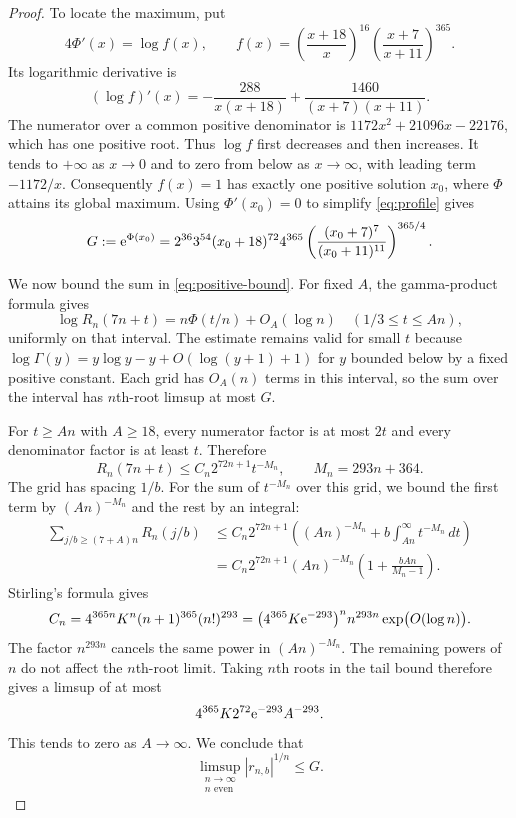 \begin{proof}
To locate the maximum, put
\begin{equation}\label{eq:f}
 4\Phi'(x)=\log f(x),\qquad
 f(x)=\left(\frac{x+18}{x}\right)^{16}
      \left(\frac{x+7}{x+11}\right)^{365}.
\end{equation}
Its logarithmic derivative is
\[
 (\log f)'(x)=-\frac{288}{x(x+18)}
                  +\frac{1460}{(x+7)(x+11)}.
\]
The numerator over a common positive denominator is
$1172x^2+21096x-22176$, which has one positive root. Thus $\log f$
first decreases and then increases. It tends to $+\infty$ as $x\to0$
and to zero from below as $x\to\infty$, with leading term $-1172/x$.
Consequently $f(x)=1$ has exactly one positive solution $x_0$, where
$\Phi$ attains its global maximum. Using $\Phi'(x_0)=0$ to simplify
\eqref{eq:profile} gives
\begin{equation}\label{eq:G}
 G:=\mathrm e^{\Phi(x_0)}
  =2^{36}3^{54}(x_0+18)^{72}4^{365}
      \left(\frac{(x_0+7)^7}{(x_0+11)^{11}}\right)^{365/4}.
\end{equation}

We now bound the sum in \eqref{eq:positive-bound}. For fixed $A$, the
gamma-product formula gives
\[
 \log R_n(7n+t)=n\Phi(t/n)+O_A(\log n)
                  \quad(1/3\leq t\leq An),
\]
uniformly on that interval. The estimate remains valid for small $t$ because
$\log\Gamma(y)=y\log y-y+O(\log(y+1)+1)$ for $y$ bounded below by
a fixed positive constant. Each grid has $O_A(n)$ terms in this interval,
so the sum over the interval has $n$th-root limsup at most $G$.

For $t\geq An$ with $A\geq18$, every numerator factor is at most $2t$
and every denominator factor is at least $t$. Therefore
\[
 R_n(7n+t)\leq C_n2^{72n+1}t^{-M_n},
 \qquad M_n=293n+364.
\]
The grid has spacing $1/b$. For the sum of $t^{-M_n}$ over this grid,
we bound the first term by $(An)^{-M_n}$ and the rest by an integral:
\begin{align*}
 \sum_{j/b\geq(7+A)n}R_n(j/b)
 &\leq C_n2^{72n+1}
       \left((An)^{-M_n}+b\int_{An}^{\infty}t^{-M_n}\,dt\right)\\
 &=C_n2^{72n+1}(An)^{-M_n}
       \left(1+\frac{bAn}{M_n-1}\right).
\end{align*}
Stirling's formula gives
\[
 C_n=4^{365n}K^n(n+1)^{365}(n!)^{293}
     =\bigl(4^{365}K\mathrm e^{-293}\bigr)^n
        n^{293n}\exp\bigl(O(\log n)\bigr).
\]
The factor $n^{293n}$ cancels the same power in $(An)^{-M_n}$.
The remaining powers of $n$ do not affect the $n$th-root limit.
Taking $n$th roots in the tail bound therefore gives a limsup of at most
\[
 4^{365}K2^{72}\mathrm e^{-293}A^{-293}.
\]
This tends to zero as $A\to\infty$. We conclude that
\begin{equation}\label{eq:unscaled-decay}
 \limsup_{\substack{n\to\infty\\n\text{ even}}}|r_{n,b}|^{1/n}\leq G.
\end{equation}


\end{proof}

